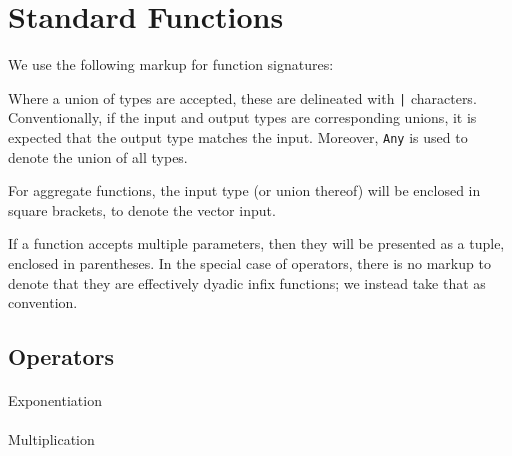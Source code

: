 % 
% 
% 
% 
% 

\section{Standard Functions}

We use the following markup for function signatures:

\begin{center}
\end{center}

Where a union of types are accepted, these are delineated with
\texttt{|} characters. Conventionally, if the input and output types are
corresponding unions, it is expected that the output type matches the
input. Moreover, \texttt{Any} is used to denote the union of all types.

For aggregate functions, the input type (or union thereof) will be
enclosed in square brackets, to denote the vector input.

If a function accepts multiple parameters, then they will be presented
as a tuple, enclosed in parentheses. In the special case of operators,
there is no markup to denote that they are effectively dyadic infix
functions; we instead take that as convention.

\subsection{Operators}

\paragraph{} Exponentiation
\paragraph{} Multiplication
